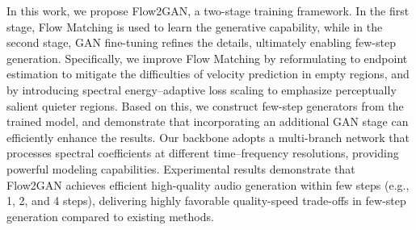 

In this work, we propose Flow2GAN, a two-stage training framework. In the first stage, Flow Matching is used to learn the generative capability, while in the second stage, GAN fine-tuning refines the details, ultimately enabling few-step generation. 
Specifically, we improve Flow Matching by reformulating to endpoint estimation to mitigate the difficulties of velocity prediction in empty regions, and by introducing spectral energy–adaptive loss scaling to emphasize perceptually salient quieter regions. 
Based on this, we construct few-step generators from the trained model, and demonstrate that incorporating an additional GAN stage can efficiently enhance the results. 
Our backbone adopts a multi-branch network that processes spectral coefficients at different time–frequency resolutions, providing powerful modeling capabilities.  
Experimental results demonstrate that Flow2GAN achieves efficient high-quality audio generation within few steps (e.g., 1, 2, and 4 steps), delivering highly favorable quality-speed trade-offs in few-step generation compared to existing methods.




